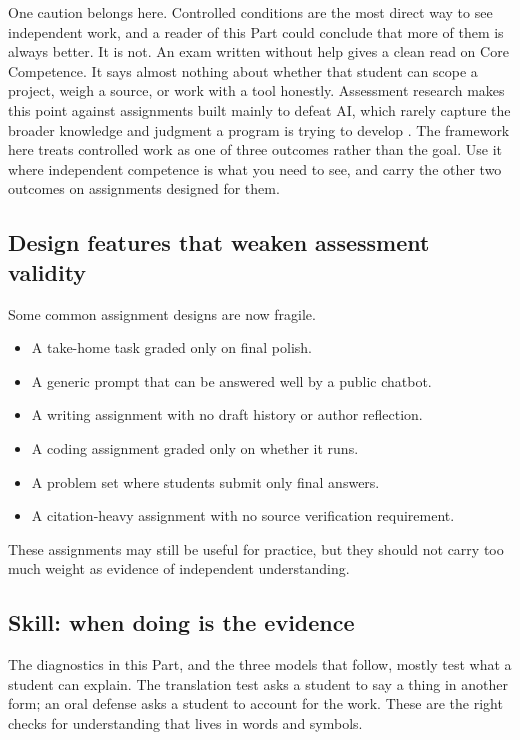 \documentclass{SIAMbook2023}
\begin{document}
One caution belongs here. Controlled conditions are the most direct way to see independent work, and a reader of this Part could conclude that more of them is always better. It is not. An exam written without help gives a clean read on Core Competence. It says almost nothing about whether that student can scope a project, weigh a source, or work with a tool honestly. Assessment research makes this point against assignments built mainly to defeat AI, which rarely capture the broader knowledge and judgment a program is trying to develop \citep{chirikov2026generative}. The framework here treats controlled work as one of three outcomes rather than the goal. Use it where independent competence is what you need to see, and carry the other two outcomes on assignments designed for them.

\subsection{Design features that weaken assessment validity}
\label{i:subsec:weak-features}

Some common assignment designs are now fragile.

\begin{itemize}
\item A take-home task graded only on final polish.
\item A generic prompt that can be answered well by a public chatbot.
\item A writing assignment with no draft history or author reflection.
\item A coding assignment graded only on whether it runs.
\item A problem set where students submit only final answers.
\item A citation-heavy assignment with no source verification requirement.
\end{itemize}

These assignments may still be useful for practice, but they should not carry too much weight as evidence of independent understanding.

\subsection{Skill: when doing is the evidence}
\label{i:subsec:skill}

The diagnostics in this Part, and the three models that follow, mostly test what a student can explain. The translation test asks a student to say a thing in another form; an oral defense asks a student to account for the work. These are the right checks for understanding that lives in words and symbols.
\end{document}
